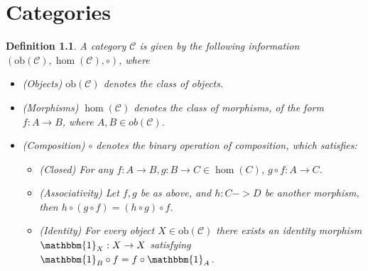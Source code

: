 \documentclass[11pt]{report}
\newcommand{\mcC}{\mathcal{C}}
\newcommand{\ob}{\text{ob}}
\newtheorem{defn}[thm]{Definition} %
\begin{document}
\chapter{Categories}
\begin{defn}
  A category $\mcC$ is given by the following information $(\ob(\mcC), \hom(\mcC), \circ)$, where
  \begin{itemize}
  \item (Objects) $\ob(\mcC)$ denotes the class of objects. \\
  \item (Morphisms) $\hom(\mcC)$ denotes the class of morphisms, of the form $f:A \to B$, where $A, B \in ob(\mcC)$. \\
  \item (Composition) $\circ$ denotes the binary operation of composition, which satisfies:
    \begin{itemize}
    \item (Closed) For any $f: A \to B, g:B \to C \in \hom(C)$, $g \circ f: A \to C$. \\
    \item (Associativity) Let $f,g$ be as above, and $h:C->D$ be another morphism, then $h \circ (g \circ f) = (h \circ g) \circ f$. \\
    \item (Identity) For every object $X \in \ob(\mcC)$ there exists an identity morphism $\mathbbm{1}_X:X \to X$ satisfying
      $\mathbbm{1}_B \circ f = f \circ \mathbbm{1}_A$.
    \end{itemize}
  \end{itemize}
\end{defn}
\end{document}

